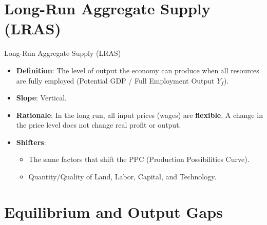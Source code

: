 \documentclass{beamer}
\begin{document}
\section{Long-Run Aggregate Supply (LRAS)}

\begin{frame}{Long-Run Aggregate Supply (LRAS)}
    \begin{itemize}
        \item \textbf{Definition}: The level of output the economy can produce when all resources are fully employed (Potential GDP / Full Employment Output $Y_f$).
        \item \textbf{Slope}: Vertical.
        \item \textbf{Rationale}: In the long run, all input prices (wages) are \textbf{flexible}. A change in the price level does not change real profit or output.
        \item \textbf{Shifters}:
        \begin{itemize}
            \item The same factors that shift the PPC (Production Possibilities Curve).
            \item Quantity/Quality of Land, Labor, Capital, and Technology.
        \end{itemize}
    \end{itemize}
\end{frame}

\section{Equilibrium and Output Gaps}
\end{document}
